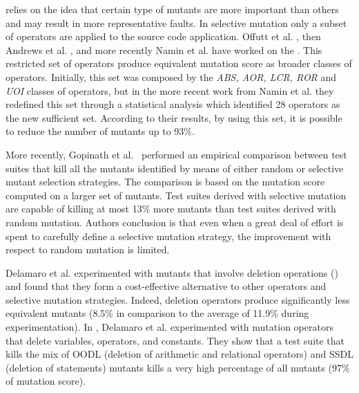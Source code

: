  relies on the idea that certain type of mutants are more important than others and may result in more representative faults. In selective mutation only a subset of operators are applied to the source code application.
Offutt et al. \cite{offutt1996experimental}, then Andrews et al. \cite{andrews2005mutation}, and more recently Namin et al. \cite{siami2008sufficient} have worked on the . This restricted set of operators produce equivalent mutation score as broader classes of operators. Initially, this set was composed by the \textit{ABS, AOR, LCR, ROR} and \textit{UOI} classes of operators, but in the more recent work from Namin et al. \cite{siami2008sufficient} they redefined this set through a statistical analysis which identified 28 operators as the new sufficient set. According to their results, by using this set, it is possible to reduce the number of mutants up to 93\%. 

More recently, Gopinath et al.~\cite{gopinath2016limits} performed an empirical comparison between 
test suites that kill all the mutants identified by means of either random or selective mutant selection strategies. 
The comparison is based on the mutation score computed on a larger set of mutants.
Test suites derived with selective mutation are capable of killing at most 13\% more mutants than test suites derived with random mutation.
Authors conclusion is that even when a great deal of effort is spent to carefully define a selective mutation strategy, the improvement with respect to random mutation is limited.

Delamaro et al. \cite{delamaro2014designing,delamaro2014experimental} experimented with mutants that involve deletion operations () and found that they form a cost-effective alternative to other operators and selective mutation strategies. Indeed, deletion operators produce significantly less equivalent mutants (8.5\% in comparison to the average of 11.9\% during experimentation). 
In \cite{delamaro2014experimental}, Delamaro et al. experimented with mutation operators that delete variables, operators, and constants. They show that a test suite that kills the mix of OODL (deletion of arithmetic and relational operators) and SSDL (deletion of statements) mutants kills a very high percentage of all mutants (97\% of mutation score).

